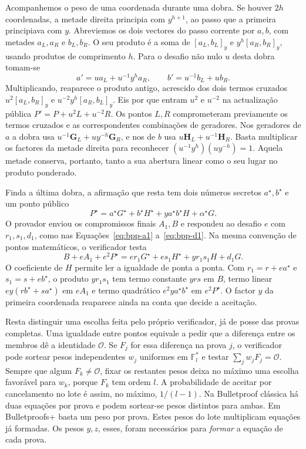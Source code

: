 Acompanhemos o peso de uma coordenada durante uma dobra. Se houver
\(2h\) coordenadas, a metade direita principia com \(y^{h+1}\), ao
passo que a primeira principiava com \(y\). Abreviemos os dois
vectores do passo corrente por \(a,b\), com metades \(a_L,a_R\) e
\(b_L,b_R\). O seu produto é a soma de
\([a_L,b_L]_y\) e \(y^h[a_R,b_R]_y\), usando produtos de comprimento
\(h\). Para o desafio não nulo \(u\) desta dobra tomam-se
\[
 a'=u a_L+u^{-1}y^h a_R,\qquad b'=u^{-1}b_L+u b_R .
\]
Multiplicando, reaparece o produto antigo, acrescido dos dois termos
cruzados \(u^2[a_L,b_R]_y\) e \(u^{-2}y^h[a_R,b_L]_y\).
Eis por que entram \(u^2\) e \(u^{-2}\) na actualização pública
\(P'=P+u^2L+u^{-2}R\). Os pontos \(L,R\) comprometeram previamente
os termos cruzados e as correspondentes combinações de geradores.
Nos geradores de \(a\) a dobra usa
\(u^{-1}\boldsymbol G_L+u y^{-h}\boldsymbol G_R\), e nos de \(b\)
usa \(u\boldsymbol H_L+u^{-1}\boldsymbol H_R\). Basta multiplicar os
factores da metade direita para reconhecer \((u^{-1}y^h)(u y^{-h})=1\).
Aquela metade conserva, portanto, tanto a sua abertura linear como o
seu lugar no produto ponderado.

Finda a última dobra, a afirmação que resta tem dois números secretos
\(a^\star,b^\star\) e um ponto público
\[
 P^\star=a^\star G^\star+b^\star H^\star+
             y a^\star b^\star H+\alpha^\star G.
\]
O provador enviou os compromissos finais \(A_1,B\) e respondeu ao
desafio \(e\) com \(r_1,s_1,d_1\), como nas
Equações~\eqref{eq:bpp-a1} a~\eqref{eq:bpp-d1}. Na mesma convenção
de pontos matemáticos, o verificador testa
\[
 B+eA_1+e^2P^\star
   =e r_1G^\star+e s_1H^\star+y r_1s_1H+d_1G .
\]
O coeficiente de \(H\) permite ler a igualdade de ponta a ponta.
Com \(r_1=r+ea^\star\) e \(s_1=s+eb^\star\), o produto \(y r_1s_1\)
tem termo constante \(yrs\) em \(B\), termo linear
\(ey(rb^\star+sa^\star)\) em \(eA_1\) e termo quadrático
\(e^2y a^\star b^\star\) em \(e^2P^\star\). O factor \(y\) da
primeira coordenada reaparece ainda na conta que decide a aceitação.

Resta distinguir uma escolha feita pelo próprio verificador, já de
posse das provas completas. Uma igualdade entre pontos equivale a
pedir que a diferença entre os membros dê a identidade \(\mathcal O\).
Se \(F_j\) for essa diferença na prova \(j\), o verificador pode
sortear pesos independentes \(w_j\) uniformes em \(\mathbb F_l^*\)
e testar \(\sum_j w_jF_j=\mathcal O\). Sempre que algum
\(F_k\ne\mathcal O\), fixar os restantes pesos deixa no máximo uma
escolha favorável para \(w_k\), porque \(F_k\) tem ordem \(l\). A
probabilidade de aceitar por cancelamento no lote é assim, no máximo,
\(1/(l-1)\). Na Bulletproof clássica há duas equações por prova e
podem sortear-se pesos distintos para ambas. Em Bulletproofs+ basta um
peso por prova. Estes pesos do lote multiplicam equações já formadas.
Os pesos \(y,z\), esses, foram necessários para \emph{formar} a
equação de cada prova.

